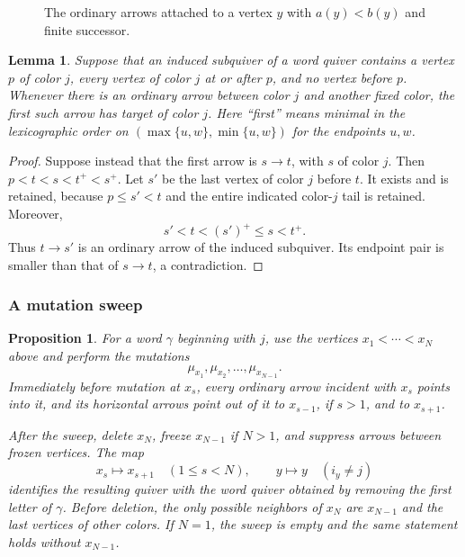 \documentclass[12pt, reqno]{amsart}
\theoremstyle{plain}
\newtheorem{proposition}[theorem]{Proposition}
\newtheorem{lemma}[theorem]{Lemma}
\theoremstyle{definition}
\numberwithin{equation}{section}
\begin{document}
\begin{figure}[htbp]
\centering
{}
\caption{The ordinary arrows attached to a vertex \(y\) with
\(a(y)<b(y)\) and finite successor.}
\label{fig:Qjk}
\end{figure}

\begin{lemma}\label{lem:firstarrow}
Suppose that an induced subquiver of a word quiver contains a vertex
\(p\) of color \(j\), every vertex of color \(j\) at or after \(p\), and
no vertex before \(p\). Whenever there is an ordinary arrow between
color \(j\) and another fixed color, the first such arrow has target
of color \(j\). Here ``first'' means minimal in the lexicographic
order on \((\max\{u,w\},\min\{u,w\})\) for the endpoints \(u,w\).
\end{lemma}

\begin{proof}
Suppose instead that the first arrow is \(s\to t\), with \(s\) of
color \(j\). Then \(p<t<s<t^+<s^+\). Let \(s'\) be the last vertex
of color \(j\) before \(t\). It exists and is retained, because
\(p\leq s'<t\) and the entire indicated color-\(j\) tail is retained.
Moreover,
\[
 s'<t<(s')^+\leq s<t^+.
\]
Thus \(t\to s'\) is an ordinary arrow of the induced subquiver. Its
endpoint pair is smaller than that of \(s\to t\), a contradiction.
\end{proof}

\subsubsection{A mutation sweep}\label{sec:mut1}

\begin{proposition}\label{pro:mu1Q}
For a word \(\gamma\) beginning with \(j\), use the vertices
\(x_1<\cdots<x_N\) above and perform the mutations
\[
 \mu_{x_1},\mu_{x_2},\ldots,\mu_{x_{N-1}}.
\]
Immediately before mutation at \(x_s\), every ordinary arrow incident
with \(x_s\) points into it, and its horizontal arrows point out of it
to \(x_{s-1}\), if \(s>1\), and to \(x_{s+1}\).

After the sweep, delete \(x_N\), freeze \(x_{N-1}\) if \(N>1\), and
suppress arrows between frozen vertices. The map
\begin{equation}\label{eq:muQ0}
 x_s\longmapsto x_{s+1}\quad(1\leq s<N),
 \qquad y\longmapsto y\quad(i_y\neq j)
\end{equation}
identifies the resulting quiver with the word quiver obtained by
removing the first letter of \(\gamma\). Before deletion, the only
possible neighbors of \(x_N\) are \(x_{N-1}\) and the last vertices
of other colors. If \(N=1\), the sweep is empty and the same statement
holds without \(x_{N-1}\).
\end{proposition}
\end{document}

